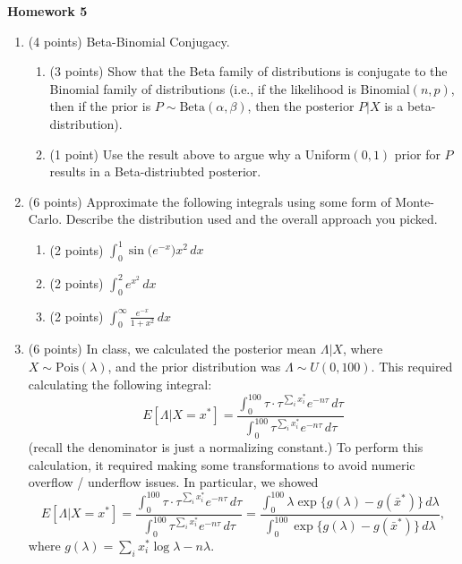 \documentclass[10pt,twoside]{article}\usepackage[]{graphicx}\usepackage[dvipsnames,svgnames,table]{xcolor}
\begin{document}
\begin{flushright}
\begin{minipage}{.33\textwidth}
\rightline{\today}
\end{minipage}
\end{flushright}

\begin{center}
{\large{\textbf{Homework 5}}}
\end{center}

\begin{enumerate}

    \item (4 points) Beta-Binomial Conjugacy.
    \begin{enumerate}
      \item (3 points) Show that the Beta family of distributions is conjugate to the Binomial family of distributions (i.e., if the likelihood is Binomial$(n, p)$, then if the prior is $P \sim \text{Beta}(\alpha, \beta)$, then the posterior $P | X$ is a beta-distribution).
      \item (1 point) Use the result above to argue why a Uniform$(0, 1)$ prior for $P$ results in a Beta-distriubted posterior.
    \end{enumerate}

    \item (6 points) Approximate the following integrals using some form of Monte-Carlo. Describe the distribution used and the overall approach you picked.
    \begin{enumerate}
      \item (2 points) $\int_0^1 \sin\big(e^{-x}\big)x^2 \, dx$
      \item (2 points) $\int_0^2 e^{x^2}\, dx$
      \item (2 points) $\int_0^\infty \frac{e^{-x}}{1 + x^2}\, dx$
    \end{enumerate}

    \item (6 points) In class, we calculated the posterior mean $\Lambda | X$, where $X \sim \text{Pois}(\lambda)$, and the prior distribution was $\Lambda \sim U(0, 100)$. This required calculating the following integral:
    $$
    E[\Lambda | X = x^*] = \frac{\int_0^{100} \tau \cdot \tau^{\sum_i x_i^*}e^{-n\tau}\, d\tau}{\int_0^{100} \tau^{\sum_i x_i^*}e^{-n\tau}\, d\tau}
    $$
    (recall the denominator is just a normalizing constant.)
    To perform this calculation, it required making some transformations to avoid numeric overflow / underflow issues. In particular, we showed
    $$
    E[\Lambda | X = x^*] = \frac{\int_0^{100} \tau \cdot \tau^{\sum_i x_i^*}e^{-n\tau}\, d\tau}{\int_0^{100} \tau^{\sum_i x_i^*}e^{-n\tau}\, d\tau} = \frac{\int_0^{100} \lambda \exp\big\{g(\lambda) - g(\bar{x}^*)\big\}\, d\lambda}{\int_0^{100} \exp\big\{g(\lambda) - g(\bar{x}^*)\big\}\, d\lambda},
    $$
    where $g(\lambda) = \sum_i x_i^* \log \lambda - n\lambda$.


\end{enumerate}
\end{document}
